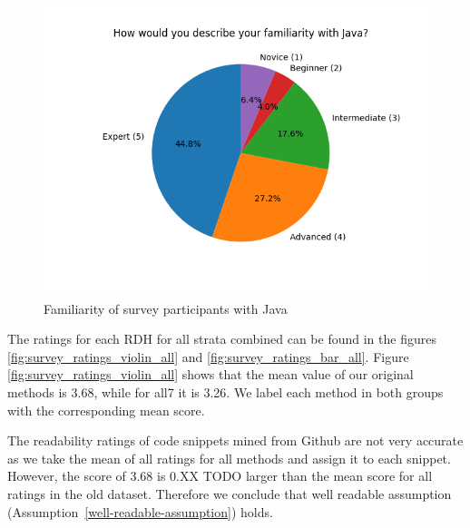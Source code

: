 \documentclass[%
class=scrreprt,
chapterprefix=false,%
open=right,%
twoside=false,%
paper=a4,%
logofile={Logo\_zentral\_farbig\_EN.png},%
thesistype=master,%
UKenglish,%
]{se2thesis}
\theoremstyle{definition}
\newenvironment{researchbox}[1]{\begin{tcolorbox}[colback=blue!10!white,colframe=blue!50!black,title=#1]}{\end{tcolorbox}}
\begin{document}
	\begin{figure}[t]
		\centering
		\includegraphics[width=\textwidth]{img/survey_java_familiarity_pie.png}
		\caption{Familiarity of survey participants with Java}
		\label{fig:survey_java_familiarity_pie}
	\end{figure}
	
	The ratings for each RDH for all strata combined can be found in the figures \ref{fig:survey_ratings_violin_all} and \ref{fig:survey_ratings_bar_all}. Figure \ref{fig:survey_ratings_violin_all} shows that the mean value of our original methods is 3.68, while for all7 it is 3.26. We label each method in both groups with the corresponding mean score.
	
	\begin{researchbox}{Summary (RQ1 - select-well):}
		The readability ratings of code snippets mined from Github are not very accurate as we take the mean of all ratings for all methods and assign it to each snippet. However, the score of 3.68 is 0.XX TODO larger than the mean score for all ratings in the old dataset. Therefore we conclude that well readable assumption (Assumption~\ref{well-readable-assumption}) holds.
	\end{researchbox}
	
\end{document}

